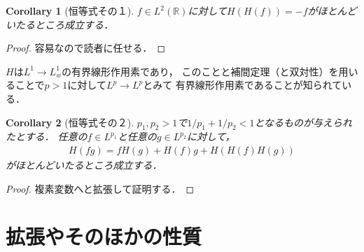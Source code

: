 \documentclass[dvipdfmx,autodetect-engine]{jsarticle}
\newtheorem{corollary}{Corollary}[theorem]
\theoremstyle{remark}
\theoremstyle{definition}
\newcommand{\R}{\mathbb{R}}
\begin{document}
\begin{corollary}[恒等式その１]
    $f \in L^2(\R)$に対して$H(H(f)) = - f$がほとんどいたるところ成立する．
\end{corollary}

\begin{proof}
    容易なので読者に任せる．
\end{proof}

$H$は$L^1 \to L^1_w$の有界線形作用素であり，
このことと補間定理（と双対性）を用いることで$p>1$に対して$L^p \to L^p$とみて
有界線形作用素であることが知られている．

\begin{corollary}[恒等式その２]
    $p_1,p_2>1$で$1/p_1 + 1/p_2 < 1$となるものが与えられたとする．
    任意の$f\in L^{p_1}$と任意の$g \in L^{p_2}$に対して，
    \begin{align}
        H(fg) = fH(g) + H(f)g + H\left(H(f)H(g)\right)
    \end{align}
    がほとんどいたるところ成立する．
\end{corollary}

\begin{proof}
    複素変数へと拡張して証明する．
\end{proof}


\section{拡張やそのほかの性質}
    
\end{document}
